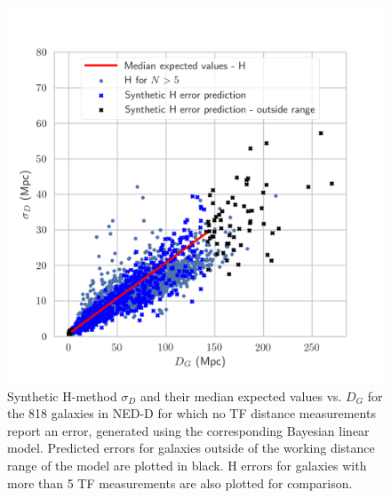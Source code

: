 \documentclass[a4paper,fleqn,usenatbib]{mnras}
\begin{document}
\begin{figure}
	\includegraphics[scale=0.7]{predl1.png}
    \caption{Synthetic H-method $\sigma_D$ and their median expected values vs. $D_G$ for the 818 galaxies in NED-D for which no TF distance measurements report an error, generated using the corresponding Bayesian linear model. Predicted errors for galaxies outside of the working distance range of the model are plotted in black. H errors for galaxies with more than 5 TF measurements are also plotted for comparison.}
    \label{fig:predl1}
\end{figure}
\end{document}
